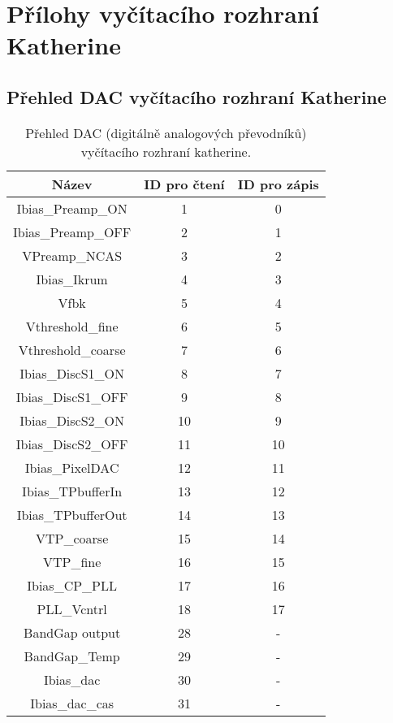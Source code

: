 \chapter{Přílohy vyčítacího rozhraní Katherine}\label{chap:app:katherine}

\section{Přehled DAC vyčítacího rozhraní Katherine}\label{chap:app:katherine:dacs}
\begin{table}[h]
	\begin{center}
		\begin{tabular}{|c|c|c|}
			\hline
            \textbf{Název} & \textbf{ID pro čtení} & \textbf{ID pro zápis} \\
			\hline
            Ibias\_Preamp\_ON & 1 & 0 \\
            Ibias\_Preamp\_OFF & 2 & 1 \\
            VPreamp\_NCAS & 3 & 2 \\
            Ibias\_Ikrum & 4 & 3 \\
            Vfbk & 5 & 4 \\
            Vthreshold\_fine & 6 & 5 \\
            Vthreshold\_coarse & 7 & 6 \\
            Ibias\_DiscS1\_ON & 8 & 7 \\
            Ibias\_DiscS1\_OFF & 9 & 8 \\
            Ibias\_DiscS2\_ON & 10 & 9 \\
            Ibias\_DiscS2\_OFF & 11 & 10 \\
            Ibias\_PixelDAC & 12 & 11 \\
            Ibias\_TPbufferIn & 13 & 12 \\
            Ibias\_TPbufferOut & 14 & 13 \\
            VTP\_coarse & 15 & 14 \\
            VTP\_fine & 16 & 15 \\
            Ibias\_CP\_PLL & 17 & 16 \\
            PLL\_Vcntrl & 18 & 17 \\
            BandGap output & 28 & - \\
            BandGap\_Temp & 29 & - \\
            Ibias\_dac & 30 & - \\
            Ibias\_dac\_cas & 31 & - \\
			\hline
		\end{tabular}
	\end{center}
	\caption{Přehled DAC (digitálně analogových převodníků) vyčítacího rozhraní katherine.}
	\label{tab:app:dacs}
\end{table}

